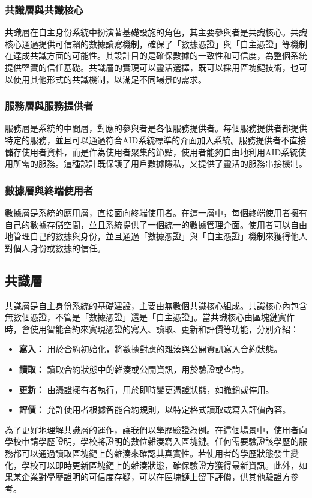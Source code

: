 \subsubsection{共識層與共識核心}
共識層在自主身份系統中扮演著基礎設施的角色，其主要參與者是共識核心。共識核心通過提供可信賴的數據讀寫機制，確保了「數據憑證」與「自主憑證」等機制在達成共識方面的可能性。其設計目的是確保數據的一致性和可信度，為整個系統提供堅實的信任基礎。共識層的實現可以靈活選擇，既可以採用區塊鏈技術，也可以使用其他形式的共識機制，以滿足不同場景的需求。
\subsubsection{服務層與服務提供者}
服務層是系統的中間層，對應的參與者是各個服務提供者。每個服務提供者都提供特定的服務，並且可以通過符合AID系統標準的介面加入系統。服務提供者不直接儲存使用者資料，而是作為使用者聚集的節點，使用者能夠自由地利用AID系統使用所需的服務。這種設計既保護了用戶數據隱私，又提供了靈活的服務串接機制。
\subsubsection{數據層與終端使用者}
數據層是系統的應用層，直接面向終端使用者。在這一層中，每個終端使用者擁有自己的數據存儲空間，並且系統提供了一個統一的數據管理介面。使用者可以自由地管理自己的數據與身份，並且通過「數據憑證」與「自主憑證」機制來獲得他人對個人身份或數據的信任。
\subsection{共識層}
共識層是自主身份系統的基礎建設，主要由無數個共識核心組成。共識核心內包含無數個憑證，不管是「數據憑證」還是「自主憑證」。當共識核心由區塊鏈實作時，會使用智能合約來實現憑證的寫入、讀取、更新和評價等功能，分別介紹：
\begin{itemize}
  \item \textbf{寫入：} 用於合約初始化，將數據對應的雜湊與公開資訊寫入合約狀態。
  \item \textbf{讀取：} 讀取合約狀態中的雜湊或公開資訊，用於驗證或查詢。
  \item \textbf{更新：} 由憑證擁有者執行，用於即時變更憑證狀態，如撤銷或停用。
  \item \textbf{評價：} 允許使用者根據智能合約規則，以特定格式讀取或寫入評價內容。
\end{itemize}
為了更好地理解共識層的運作，讓我們以學歷驗證為例。在這個場景中，使用者向學校申請學歷證明，學校將證明的數位雜湊寫入區塊鏈。任何需要驗證該學歷的服務都可以通過讀取區塊鏈上的雜湊來確認其真實性。若使用者的學歷狀態發生變化，學校可以即時更新區塊鏈上的雜湊狀態，確保驗證方獲得最新資訊。此外，如果某企業對學歷證明的可信度存疑，可以在區塊鏈上留下評價，供其他驗證方參考。

